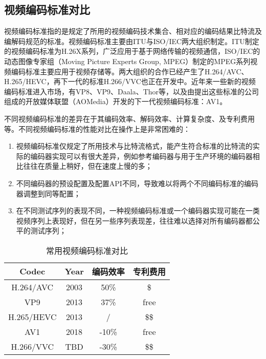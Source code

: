 \subsection{视频编码标准对比}

视频编码标准指的是规定了所用的视频编码技术集合、相对应的编码结果比特流及编解码规范的标准。视频编码标准主要由ITU与ISO/IEC两大组织制定。ITU制定的视频编码标准为H.26X系列，广泛应用于基于网络传输的视频通信，ISO/IEC的动态图像专家组（Moving Picture Experts Group, MPEG）制定的MPEG系列视频编码标准主要应用于视频存储等。两大组织的合作已经产生了H.264/AVC、H.265/HEVC，再下一代的标准H.266/VVC也正在开发中。近年来一些新的视频编码标准进入市场，有VP8、VP9、Daala、Thor等，以及由提出这些标准的公司组成的开放媒体联盟（AOMedia）开发的下一代视频编码标准：AV1。

不同视频编码标准的差异在于其编码效率、解码效率、计算复杂度、及专利费用等。不同视频编码标准的性能对比在操作上是非常困难的\cite{laudeComprehensiveVideoCodec2019}：
\begin{enumerate} [label=\arabic*)]
  \item 视频编码标准仅规定了所用技术与比特流格式，能产生符合标准的比特流的实际的编码器实现可以有很大差异，例如参考编码器与用于生产环境的编码器相比往往在质量上稍好，但在速度上慢的多；
  \item 不同编码器的预设配置及配置API不同，导致难以将两个不同编码标准的编码器调整到同等配置；
  \item 在不同测试序列的表现不同，一种视频编码标准或一个编码器实现可能在一类视频序列上表现好，但在另一些序列表现差，往往难以选择对所有编码器都公平的测试序列；
\end{enumerate}

\begin{table}[!hpt]
  \renewcommand{\arraystretch}{0.9}
  \caption{常用视频编码标准对比}
  \label{tab:codec}
  \centering
  \begin{tabular}{cccc}
  	\toprule
  	  Codec    & Year & 编码效率  & 专利费用 \\ \midrule
  	H.264/AVC  & 2003 & 50\%  &  \$  \\ %
  	   VP9     & 2013 & 37\%  & free \\
  	H.265/HEVC & 2013 &   /   & \$\$ \\
  	   AV1     & 2018 & -10\% & free \\
  	H.266/VVC  & TBD  & -30\% & \$\$ \\ \bottomrule
  \end{tabular}
\end{table}

